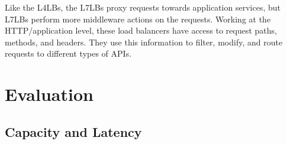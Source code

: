 \documentclass[12pt]{article}
\begin{document}
Like the L4LBs, the L7LBs proxy requests towards application services, but L7LBs perform more middleware actions on the requests. Working at the HTTP/application level, these load balancers have access to request paths, methods, and headers. They use this information to filter, modify, and route requests to different types of APIs.


\section{Evaluation}

\subsection{Capacity and Latency}
\end{document}
